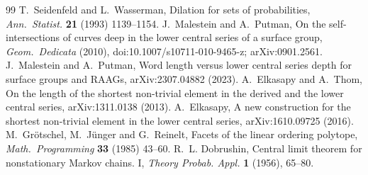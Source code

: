 \documentclass[11pt]{article}
\theoremstyle{definition}\newtheorem{definition}[theorem]{Definition}\newtheorem{remark}[theorem]{Remark}\newtheorem{example}[theorem]{Example}\newtheorem{problem}[theorem]{Open problem}\crefname{problem}{Problem}{Problems}
\begin{document}
\begin{thebibliography}{99}
 T.~Seidenfeld and L.~Wasserman, Dilation for sets of probabilities, \emph{Ann.\ Statist.} \textbf{21} (1993) 1139--1154.
 J.~Malestein and A.~Putman, On the self-intersections of curves deep in the lower central series of a surface group, \emph{Geom.\ Dedicata} (2010), doi:10.1007/s10711-010-9465-z; arXiv:0901.2561.
 J.~Malestein and A.~Putman, Word length versus lower central series depth for surface groups and RAAGs, arXiv:2307.04882 (2023).
 A.~Elkasapy and A.~Thom, On the length of the shortest non-trivial element in the derived and the lower central series, arXiv:1311.0138 (2013).
 A.~Elkasapy, A new construction for the shortest non-trivial element in the lower central series, arXiv:1610.09725 (2016).
 M.~Gr\"otschel, M.~J\"unger and G.~Reinelt, Facets of the linear ordering polytope, \emph{Math.\ Programming} \textbf{33} (1985) 43--60.
R.~L. Dobrushin, Central limit theorem for nonstationary Markov chains. I, \emph{Theory Probab. Appl.} \textbf{1} (1956), 65--80.


\end{thebibliography}
\end{document}
